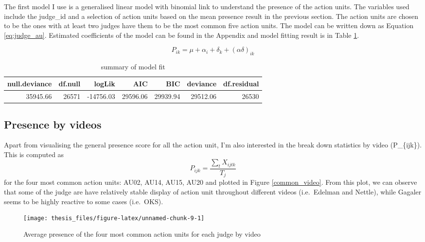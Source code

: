 \documentclass{monashthesis}
\begin{document}
The first model I use is a generalised linear model with binomial link to understand the presence of the action units. The variables used include the judge\_id and a selection of action units based on the mean presence result in the previous section. The action units are chosen to be the ones with at least two judges have them to be the most common five action units. The model can be written down as Equation \ref{eq:judge_au}. Estimated coefficients of the model can be found in the Appendix and model fitting result is in Table \ref{tab:glance_1}.

\begin{equation}\label{eq:judge_au}
P_{ik} = \mu + \alpha_i + \delta_k + (\alpha\delta)_{ik}
\end{equation}

\begin{table}[t]

\caption{\label{tab:unnamed-chunk-8}\label{tab:glance_1}summary of model fit}
\centering
\begin{tabular}{r|r|r|r|r|r|r}
\hline
null.deviance & df.null & logLik & AIC & BIC & deviance & df.residual\\
\hline
35945.66 & 26571 & -14756.03 & 29596.06 & 29939.94 & 29512.06 & 26530\\
\hline
\end{tabular}
\end{table}

\hypertarget{presence-by-videos}{%
\subsection{Presence by videos}\label{presence-by-videos}}

Apart from visualising the general presence score for all the action unit, I'm also interested in the break down statistics by video (P\_\{ijk\}). This is computed as \[P_{ijk} = \frac{\sum_{t}X_{ijtk}}{T_j}\] for the four most common action units: AU02, AU14, AU15, AU20 and plotted in Figure \ref{common_video}. From this plot, we can observe that some of the judge are have relatively stable display of action unit throughout different videos (i.e.~Edelman and Nettle), while Gagaler seems to be highly reactive to some cases (i.e.~OKS).

\begin{figure}
\texttt{[image: thesis\_files/figure-latex/unnamed-chunk-9-1]} \caption{Average presence of the four most common action units for each judge by video\label{fig:common_video}}\label{fig:unnamed-chunk-9}
\end{figure}
\end{document}
